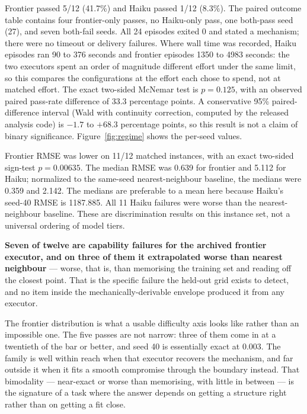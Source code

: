 \documentclass[11pt]{article}
\theoremstyle{definition}
\begin{document}
Frontier passed 5/12 (41.7\%) and Haiku passed 1/12 (8.3\%). The paired outcome table
contains four frontier-only passes, no Haiku-only pass, one both-pass seed (27), and
seven both-fail seeds. All 24 episodes exited 0 and stated a mechanism; there were no
timeout or delivery failures. Where wall time was recorded, Haiku episodes ran 90 to
376 seconds and frontier episodes 1350 to 4983 seconds: the two executors spent an
order of magnitude different effort under the same limit, so this compares the
configurations at the effort each chose to spend, not at matched effort. The exact two-sided McNemar test is $p=0.125$, with an
observed paired pass-rate difference of 33.3 percentage points. A conservative 95\% paired-difference interval (Wald with continuity correction,
computed by the released analysis code) is $-1.7$ to $+68.3$ percentage points, so
this result is not a claim of binary significance. Figure~\ref{fig:regime} shows the
per-seed values.

Frontier RMSE was lower on 11/12 matched instances, with an exact two-sided sign-test
$p=0.00635$. The median RMSE was 0.639 for frontier and 5.112 for Haiku; normalized
to the same-seed nearest-neighbour baseline, the medians were 0.359 and 2.142.
The medians are preferable to a mean here because Haiku's seed-40 RMSE is 1187.885.
All 11 Haiku failures were worse than the nearest-neighbour baseline. These are
discrimination results on this instance set, not a universal ordering of model tiers.

\textbf{Seven of twelve are capability failures for the archived frontier executor, and on three of them it extrapolated worse than nearest neighbour} --- worse, that is, than memorising the training set and reading off the closest point. That is the specific failure the held-out grid exists to detect, and no item inside the mechanically-derivable envelope produced it from any executor.

The frontier distribution is what a usable difficulty axis looks like rather than an impossible one. The five passes are not narrow: three of them come in at a twentieth of the bar or better, and seed 40 is essentially exact at 0.003. The family is well within reach when that executor recovers the mechanism, and far outside it when it fits a smooth compromise through the boundary instead. That bimodality --- near-exact or worse than memorising, with little in between --- is the signature of a task where the answer depends on getting a structure right rather than on getting a fit close.
\end{document}
